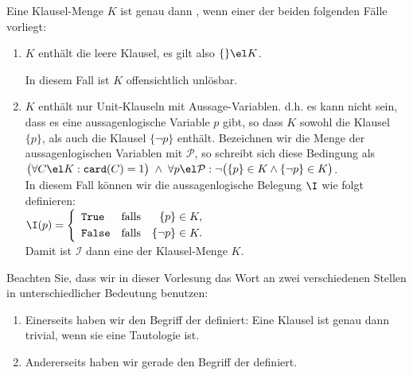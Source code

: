 \begin{Definition}
  Eine Klausel-Menge $K$ ist genau dann , wenn einer der beiden folgenden Fälle
  vorliegt:
  \begin{enumerate}
  \item $K$ enthält die leere Klausel, es gilt also $\{\} \el K$.

        In diesem Fall ist $K$ offensichtlich unlösbar.
  \item $K$ enthält nur Unit-Klauseln mit \underline{} Aussage-Variablen. d.h. es kann nicht
        sein, dass es eine aussagenlogische Variable $p$ gibt, so dass $K$ sowohl die Klausel $\{p\}$, als auch die
        Klausel $\{\neg p \}$ enthält.  Bezeichnen wir die Menge der aussagenlogischen Variablen mit $\mathcal{P}$,
        so schreibt sich diese Bedingung als 
        \\[0.3cm]
        \hspace*{1.3cm}
        $\bigl(\forall C \el K: \texttt{card}(C) = 1\bigr) \;\wedge\;
         \forall p \el \mathcal{P}: \neg\bigl( \{p\} \in K \wedge \{\neg p\} \in K\bigr)$.
        \\[0.3cm]
        In diesem Fall können wir die aussagenlogische Belegung $\I$ wie folgt definieren:
        \\[0.2cm]
        \hspace*{1.3cm}
        $\I(p) = \left\{
                   \begin{array}{lcr}
                     \texttt{True}  & \mbox{falls} & \{p\}      \in K, \\[0.1cm]
                     \texttt{False} & \mbox{falls} & \{\neg p\} \in K.
                   \end{array}
                   \right.
        $
        \\[0.2cm]
        Damit ist $\mathcal{I}$ dann eine  der Klausel-Menge $K$. \eox
  \end{enumerate}
\end{Definition}

\remark
Beachten Sie, dass wir in dieser Vorlesung das Wort  an zwei verschiedenen Stellen in
unterschiedlicher Bedeutung benutzen:
\begin{enumerate}
\item Einerseits haben wir den Begriff der  definiert:  Eine Klausel ist genau dann trivial,
      wenn sie eine Tautologie ist.
\item Andererseits haben wir gerade den Begriff der  definiert.  \eox
\end{enumerate}

